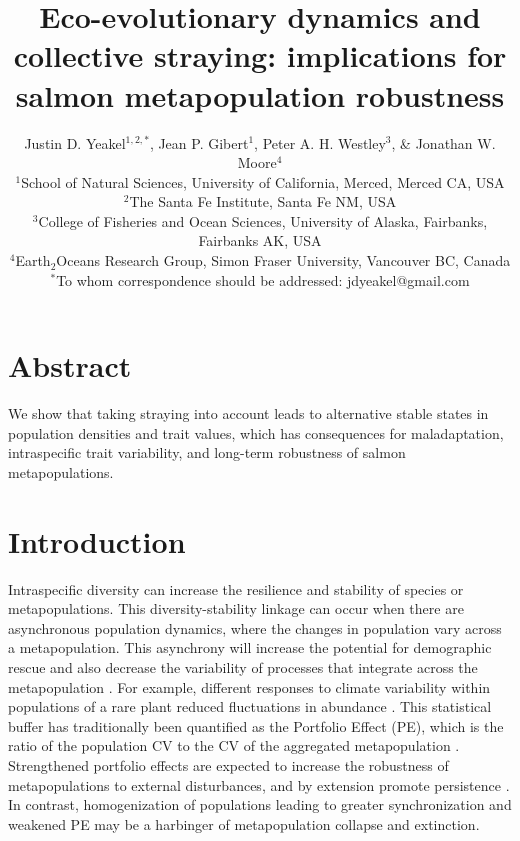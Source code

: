\documentclass[twocolumn,preprintnumbers,amsmath,amssymb,superscriptaddress]{revtex4}
\begin{document}
\title{Eco-evolutionary dynamics and collective straying: implications for salmon metapopulation robustness}
\author{Justin D. Yeakel${}^{1,2,*}$, Jean P. Gibert${}^{1}$, Peter A. H. Westley${}^{3}$, \& Jonathan W. Moore${}^{4}$ \\
${}^1$School of Natural Sciences, University of California, Merced, Merced CA, USA \\
${}^2$The Santa Fe Institute, Santa Fe NM, USA \\
${}^3$College of Fisheries and Ocean Sciences, University of Alaska, Fairbanks, Fairbanks AK, USA \\
${}^4$Earth${}_2$Oceans Research Group, Simon Fraser University, Vancouver BC, Canada \\
${}^*$To whom correspondence should be addressed: jdyeakel@gmail.com
}



\maketitle

\section*{Abstract}
{\small
We show that taking straying into account leads to alternative stable states in population densities and trait values, which has consequences for maladaptation, intraspecific trait variability, and long-term robustness of salmon metapopulations.
}
\section{Introduction}


Intraspecific diversity can increase the resilience and stability of species or metapopulations. 
This diversity-stability linkage can occur when there are asynchronous population dynamics, where the changes in population vary across a metapopulation. 
This asynchrony will increase the potential for demographic rescue \cite{Brown:1977gk,Earn:2000fm} and also decrease the variability of processes that integrate across the metapopulation \cite{Anonymous:2015gf}. 
For example, different responses to climate variability within populations of a rare plant reduced fluctuations in abundance \cite{Abbott:2017hl}. 
This statistical buffer has traditionally been quantified as the Portfolio Effect (PE), which is the ratio of the population CV to the CV of the aggregated metapopulation \cite{Thibaut:2012km}. 
Strengthened portfolio effects are expected to increase the robustness of metapopulations to external disturbances, and by extension promote persistence \cite{Thibaut:2012km}.
In contrast, homogenization of populations leading to greater synchronization and weakened PE may be a harbinger of metapopulation collapse and extinction.
\end{document}
